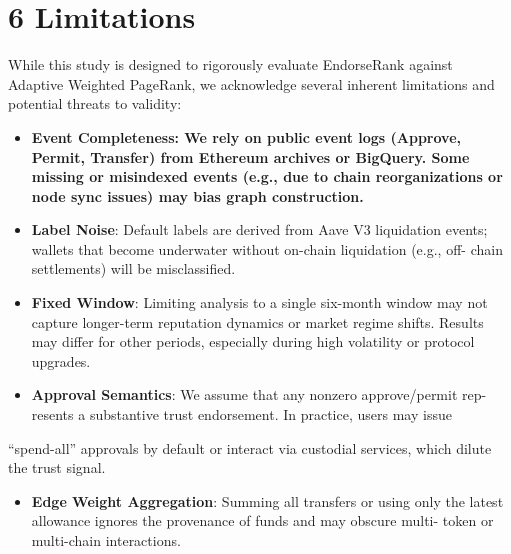\clearpage
{}
\section*{6 \textbf{Limitations}}
\label{sec:limitations}

While this study is designed to rigorously evaluate EndorseRank against Adaptive Weighted PageRank, we acknowledge several inherent limitations and potential threats to validity:



\begin{itemize}
\item[\textbullet] \textbf{Event Completeness: We rely on public event logs (Approve, Permit, Transfer) from Ethereum archives or BigQuery. Some missing or misindexed events (e.g., due to chain reorganizations or node sync issues) may bias graph construction.}
\item[\textbullet] \textbf{Label Noise}: Default labels are derived from Aave V3 liquidation events; wallets that become underwater without on-chain liquidation (e.g., off- chain settlements) will be misclassified.
\end{itemize}

\begin{itemize}
\item[\textbullet] \textbf{Fixed Window}: Limiting analysis to a single six-month window may not capture longer-term reputation dynamics or market regime shifts. Results may differ for other periods, especially during high volatility or protocol upgrades.
\end{itemize}

\begin{itemize}
\item[\textbullet] \textbf{Approval Semantics}: We assume that any nonzero approve/permit rep- resents a substantive trust endorsement. In practice, users may issue
\end{itemize}
``spend-all'' approvals by default or interact via custodial services, which dilute the trust signal.


\begin{itemize}
\item[\textbullet] \textbf{Edge Weight Aggregation}: Summing all transfers or using only the latest allowance ignores the provenance of funds and may obscure multi- token or multi-chain interactions.
\end{itemize}

